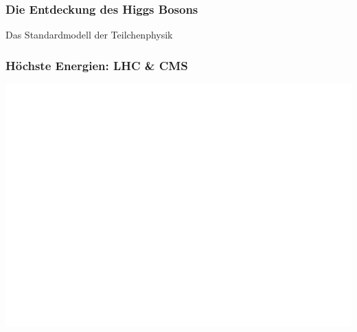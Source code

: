 \documentclass[14pt]{beamer}
\begin{document}
\begin{frame}
	\frametitle{Die Entdeckung des Higgs Bosons}
	\begin{center}
	\end{center}
\end{frame}

\begin{frame}
	\centering
	\huge{Das Standardmodell der Teilchenphysik}
\end{frame}

\begin{frame}
	\frametitle{Höchste Energien: LHC \& CMS}
	\begin{center}
		\includegraphics[width=\textwidth]{dimuon.png}
	\end{center}
\end{frame}
\end{document}
